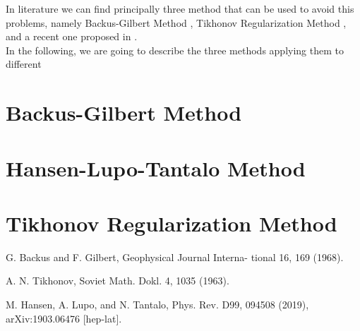 \documentclass[a4paper,10pt]{article}
\begin{document}
In literature we can find principally three method that can be used to avoid this problems, namely Backus-Gilbert Method \cite{BG}, Tikhonov Regularization Method \cite{TR}, and a recent one proposed in \cite{Nazario}.\\
In the following, we are going to describe the three methods applying them to different 


\section{Backus-Gilbert Method}
\section{Hansen-Lupo-Tantalo Method}
\section{Tikhonov Regularization Method}


\newpage
\begin{thebibliography}{9}
G. Backus and F. Gilbert, Geophysical Journal Interna- tional 16, 169 (1968).

A. N. Tikhonov, Soviet Math. Dokl. 4, 1035 (1963).

M. Hansen, A. Lupo, and N. Tantalo, Phys. Rev. D99,
094508 (2019), arXiv:1903.06476 [hep-lat].

\end{thebibliography}
\end{document}
